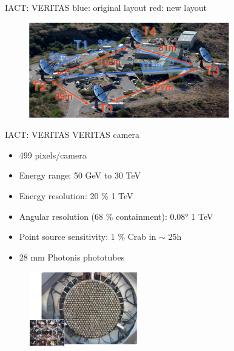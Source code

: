 \documentclass{beamer}
\begin{document}
\begin{frame}{IACT: VERITAS}
    blue: original layout
    \newline
    red: new layout
    \begin{figure}[h]
        \includegraphics[width=330px]{VERITAS_array.png}
    \end{figure}
\end{frame}


\begin{frame}{IACT: VERITAS}
    VERITAS camera
    \begin{itemize}
        \item 499 pixels/camera
        \item Energy range: 50 GeV to 30 TeV
        \item Energy resolution: 20 \% \@ 1 TeV
        \item Angular resolution (68 \% containment): 0.08° \@ 1 TeV
        \item Point source sensitivity: 1 \% Crab in $\sim$ 25h
        \item 28 mm Photonis phototubes
    \end{itemize}
    \begin{figure}[h]
        \includegraphics[width=180px]{VERITAS_camera.png}
    \end{figure}
\end{frame}
\end{document}
